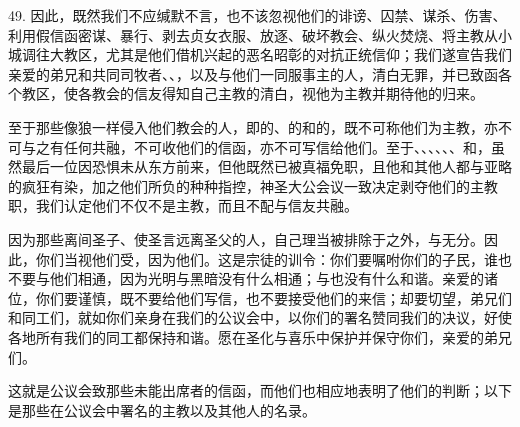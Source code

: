 49. 因此，既然我们不应缄默不言，也不该忽视他们的诽谤、囚禁、谋杀、伤害、利用假信函密谋、暴行、剥去贞女衣服、放逐、破坏教会、纵火焚烧、将主教从小城调往大教区，尤其是他们借机兴起的恶名昭彰的对抗正统信仰；我们遂宣告我们亲爱的弟兄和共同司牧者、、，以及与他们一同服事主的人，清白无罪，并已致函各个教区，使各教会的信友得知自己主教的清白，视他为主教并期待他的归来。\par

至于那些像狼一样侵入他们教会的人，即的、的和的，既不可称他们为主教，亦不可与之有任何共融，不可收他们的信函，亦不可写信给他们。至于、、、、、、和，虽然最后一位因恐惧未从东方前来，但他既然已被真福免职，且他和其他人都与亚略的疯狂有染，加之他们所负的种种指控，神圣大公会议一致决定剥夺他们的主教职，我们认定他们不仅不是主教，而且不配与信友共融。\par

因为那些离间圣子、使圣言远离圣父的人，自己理当被排除于之外，与无分。因此，你们当视他们受，因为他们。这是宗徒的训令：你们要嘱咐你们的子民，谁也不要与他们相通，因为光明与黑暗没有什么相通；与也没有什么和谐。亲爱的诸位，你们要谨慎，既不要给他们写信，也不要接受他们的来信；却要切望，弟兄们和同工们，就如你们亲身在我们的公议会中，以你们的署名赞同我们的决议，好使各地所有我们的同工都保持和谐。愿在圣化与喜乐中保护并保守你们，亲爱的弟兄们。\par

\par

这就是公议会致那些未能出席者的信函，而他们也相应地表明了他们的判断；以下是那些在公议会中署名的主教以及其他人的名录。\par

